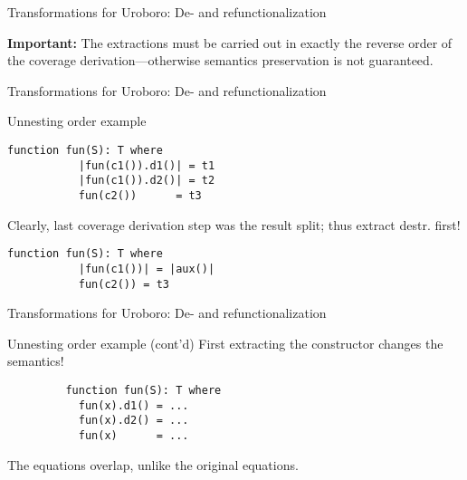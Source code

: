 \documentclass[xcolor=svgnames]{beamer}
\begin{document}
\begin{frame}
  {Transformations for Uroboro: De- and refunctionalization}

\textbf{Important:} The extractions must be carried out in exactly the reverse order of the coverage derivation---otherwise semantics preservation is not guaranteed.

\end{frame}

\begin{frame}[fragile]
  {Transformations for Uroboro: De- and refunctionalization}

  \begin{block}{Unnesting order example}
    \begin{block}{}
      \begin{lstlisting}[style=base, gobble=4]
         function fun(S): T where
           |fun(c1()).d1()| = t1
           |fun(c1()).d2()| = t2
           fun(c2())      = t3
      \end{lstlisting}
    \end{block}
    Clearly, last coverage derivation step was the result split; thus extract destr. first!
    \begin{block}{}
      \begin{lstlisting}[style=base, gobble=4]
         function fun(S): T where
           |fun(c1())| = |aux()|
           fun(c2()) = t3
      \end{lstlisting}
    \end{block}
  \end{block}
\end{frame}

\begin{frame}[fragile]
  {Transformations for Uroboro: De- and refunctionalization}

  \begin{block}{Unnesting order example (cont'd)}
    First extracting the constructor changes the semantics!
    \begin{block}{}
      \begin{lstlisting}
         function fun(S): T where
           fun(x).d1() = ...
           fun(x).d2() = ...
           fun(x)      = ...
      \end{lstlisting}
    \end{block}
    The equations overlap, unlike the original equations.
  \end{block}
\end{frame}
\end{document}
